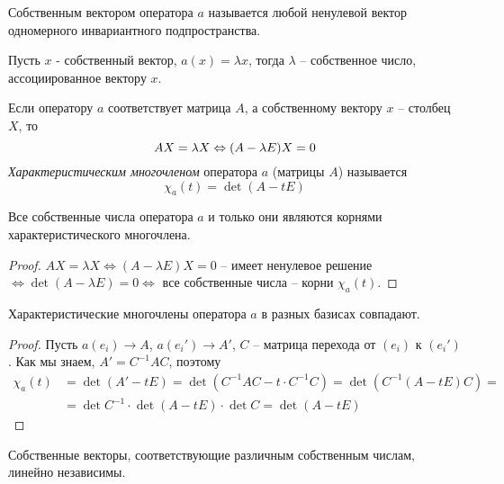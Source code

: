 \begin{Def}
	Собственным вектором оператора $a$ называется любой ненулевой вектор одномерного инвариантного подпространства.
\end{Def} 

\begin{Def}
	Пусть $x$ - собственный вектор, $a(x) = \lambda x$, тогда $\lambda$ -- собственное число, ассоциированное вектору $x$.
\end{Def} 

\begin{Def}
	Если оператору $a$ соответствует матрица $A$, а собственному вектору $x$ -- столбец $X$, то
	\[AX = \lambda X \Leftrightarrow (A - \lambda E)X = 0\]
	\textit{Характеристическим многочленом}  оператора $a$ (матрицы $A$) называется
	\[\chi_a(t) = \det (A-tE)\]
\end{Def} 

\begin{Thm}
	Все собственные числа оператора $a$ и только они являются корнями характеристического многочлена. 
\end{Thm}

\begin{proof}
	$AX = \lambda X \Leftrightarrow (A - \lambda E)X = 0$ -- имеет ненулевое решение $\Leftrightarrow 
	\det(A-\lambda E) = 0 \Leftrightarrow$ все собственные числа -- корни $\chi_a(t)$.
\end{proof}

\begin{Lm}
	Характеристические многочлены оператора $a$ в разных базисах совпадают. 
\end{Lm}

\begin{proof}
	Пусть $a(e_i) \to A$,  $a(e_i') \to A'$,  $C$ -- матрица перехода от $(e_i)$ к $(e_i')$. 
	Как мы знаем, $A' = C^{-1}AC$, поэтому 
	\begin{align*}
		\chi_a(t) &= \det (A' - tE) = \det (C^{-1}AC - t \cdot C^{-1}C) = \det(C^{-1} (A-tE)C) = \\
		&= \det C^{-1} \cdot \det(A - tE) \cdot \det C = \det(A-tE)
	\end{align*}
\end{proof}

\begin{Thm}
	Собственные векторы, соответствующие различным собственным числам, линейно независимы. 
\end{Thm} 

